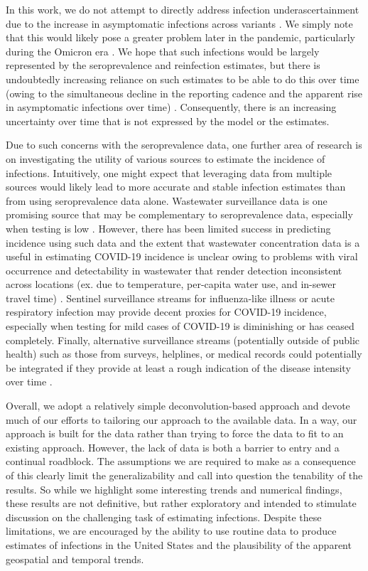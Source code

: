 \documentclass{article}
\begin{document}
In this work, we do not attempt to directly address infection underascertainment due to the increase in asymptomatic infections across variants \citep{pho2023covid19}. We simply note that this would likely pose a greater problem later in the pandemic, particularly during the Omicron era \citep{fan2022sars}. We hope that such infections would be largely represented by the seroprevalence and reinfection estimates, but there is undoubtedly increasing reliance on such estimates to be able to do this over time (owing to the simultaneous decline in the reporting cadence and the apparent rise in asymptomatic infections over time) \citep{oph2022covid, garrett2022high, blauer2022reduce, ren2021asymptomatic}. Consequently, there is an increasing uncertainty over time that is not expressed by the model or the estimates.   

Due to such concerns with the seroprevalence data, one further area of research is on investigating the utility of various sources to estimate the incidence of infections. Intuitively, one might expect that leveraging data from multiple sources would likely lead to more accurate and stable infection estimates than from using seroprevalence data alone. Wastewater surveillance data is one promising source that may be complementary to seroprevalence data, especially when testing is low \citep{mcmanus2023predicting}. However, there has been limited success in predicting incidence using such data and the extent that wastewater concentration data is a useful in estimating COVID-19 incidence is unclear owing to problems with viral occurrence and detectability in wastewater that render detection inconsistent across locations (ex. due to temperature, per-capita water use, and in-sewer travel time) \citep{mcmanus2023predicting, hart2020computational, li2023correlation}. Sentinel surveillance streams for influenza-like illness or acute respiratory infection may provide decent proxies for COVID-19 incidence, especially when testing for mild cases of COVID-19 is diminishing or has ceased completely. Finally, alternative surveillance streams (potentially outside of public health) such as those from surveys, helplines, or medical records could potentially be integrated if they provide at least a rough indication of the disease intensity over time \citep{ecdc2020strategies}.
 
Overall, we adopt a relatively simple deconvolution-based approach and devote much of our efforts to tailoring our approach to the available data. In a way, our approach is built for the data rather than trying to force the data to fit to an existing approach. However, the lack of data is both a barrier to entry and a continual roadblock. The assumptions we are required to make as a consequence of this clearly limit the generalizability and call into question the tenability of the results. So while we highlight some interesting trends and numerical findings, these results are not definitive, but rather exploratory and intended to stimulate discussion on the challenging task of estimating infections. Despite these limitations, we are encouraged by the ability to use routine data to produce estimates of infections in the United States and the plausibility of the apparent geospatial and temporal trends. 
\end{document}
